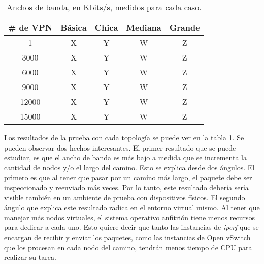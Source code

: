 \begin{table}[ht]
	\caption{Anchos de banda, en Kbits/s, medidos para cada caso.}
	\centering 
	\begin{tabular}{c c c c c}
		\hline\hline
		\# de VPN & Básica & Chica & Mediana  & Grande \\ [0.5ex]
		\hline
		1 & X & Y & W & Z \\
		3000 & X & Y & W & Z  \\
		6000 & X & Y & W & Z \\
		9000 & X & Y & W & Z \\
		12000 & X & Y & W & Z \\
		15000 & X & Y & W & Z \\ [1ex]
		\hline
	\end{tabular}
	\label{table:escala_de_servicios}
\end{table}

Los resultados de la prueba con cada topología se puede ver en la tabla \ref{table:escala_de_servicios}. Se pueden observar dos hechos interesantes. El primer resultado que se puede estudiar, es que el ancho de banda es más bajo a medida que se incrementa la cantidad de nodos y/o el largo del camino. Esto se explica desde dos ángulos. El primero es que al tener que pasar por un camino más largo, el paquete debe ser inspeccionado y reenviado más veces. Por lo tanto, este resultado debería sería visible también en un ambiente de prueba con dispositivos físicos. El segundo ángulo que explica este resultado radica en el entorno virtual mismo. Al tener que manejar más nodos virtuales, el sistema operativo anfitrión tiene menos recursos para dedicar a cada uno. Esto quiere decir que tanto las instancias de \textit{iperf} que se encargan de recibir y enviar los paquetes, como las instancias de Open vSwitch que los procesan en cada nodo del camino, tendrán menos tiempo de CPU para realizar su tarea. \\

